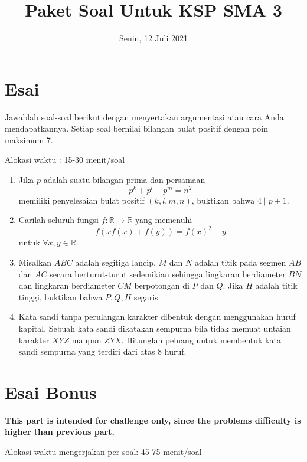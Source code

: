 \documentclass{article}
\title{Paket Soal Untuk KSP SMA 3}
\date{Senin, 12 Juli 2021}
\begin{document}
	\maketitle

\section{Esai}
Jawablah soal-soal berikut dengan menyertakan argumentasi atau cara Anda mendapatkannya. Setiap soal bernilai bilangan bulat positif dengan poin maksimum 7.

Alokasi waktu : 15-30 menit/soal

\begin{enumerate}[resume]
	\item Jika $p$ adalah suatu bilangan prima dan persamaan $$p^k+p^l+p^m=n^2$$ memiliki penyelesaian bulat positif $(k,l,m,n)$, buktikan bahwa $4\mid p+1.$
	
	\item Carilah seluruh fungsi $f:\mathbb{R}\rightarrow\mathbb{R}$ yang memenuhi $$f(xf(x)+f(y))=f(x)^2+y$$ untuk $\forall x,y\in\mathbb{R}.$
	
	\item Misalkan $ABC$ adalah segitiga lancip. $M$ dan $N$ adalah titik pada segmen $AB$ dan $AC$ secara berturut-turut sedemikian sehingga lingkaran berdiameter $BN$ dan lingkaran berdiameter $CM$ berpotongan di $P$ dan $Q$. Jika $H$ adalah titik tinggi, buktikan bahwa $P,Q,H$ segaris.
	
	\item Kata sandi tanpa perulangan karakter dibentuk dengan menggunakan huruf kapital. Sebuah kata sandi dikatakan sempurna bila tidak memuat untaian karakter $XYZ$ maupun $ZYX$. Hitunglah peluang untuk membentuk kata sandi sempurna yang terdiri dari atas 8 huruf.
\end{enumerate}
\newpage
\section{Esai Bonus}
\textbf{This part is intended for challenge only, since the problems difficulty is higher than previous part.}

Alokasi waktu mengerjakan per soal: 45-75 menit/soal
\end{document}
